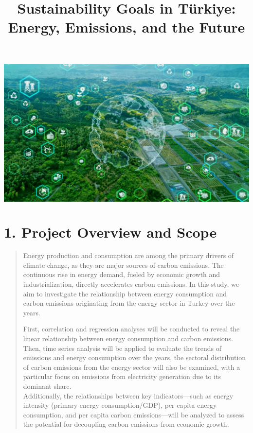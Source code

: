 \documentclass[
  letterpaper,
  DIV=11,
  numbers=noendperiod]{scrartcl}
\title{Sustainability Goals in Türkiye: Energy, Emissions, and the
Future}
\author{}
\date{}
\renewcommand*\contentsname{Table of contents}
\newcommand\contentsname{Table of contents}
\begin{document}
\maketitle

\renewcommand*\contentsname{Table of contents}
{
\hypersetup{linkcolor=}
\setcounter{tocdepth}{3}
\tableofcontents
}

\includegraphics[width=5.77083in,height=\textheight]{images/Energy.jpg}

\section{1. Project Overview and
Scope}\label{project-overview-and-scope}

\begin{quote}
Energy production and consumption are among the primary drivers of
climate change, as they are major sources of carbon emissions. The
continuous rise in energy demand, fueled by economic growth and
industrialization, directly accelerates carbon emissions. In this study,
we aim to investigate the relationship between energy consumption and
carbon emissions originating from the energy sector in Turkey over the
years.

First, correlation and regression analyses will be conducted to reveal
the linear relationship between energy consumption and carbon emissions.
Then, time series analysis will be applied to evaluate the trends of
emissions and energy consumption over the years, the sectoral
distribution of carbon emissions from the energy sector will also be
examined, with a particular focus on emissions from electricity
generation due to its dominant share.\\
Additionally, the relationships between key indicators---such as energy
intensity (primary energy consumption/GDP), per capita energy
consumption, and per capita carbon emissions---will be analyzed to
assess the potential for decoupling carbon emissions from economic
growth.
\end{quote}
\end{document}
